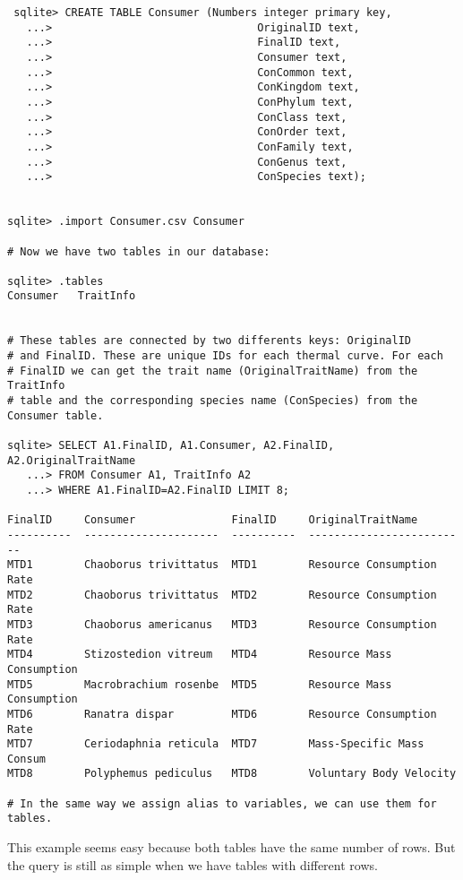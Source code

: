  \begin{lstlisting}
 sqlite> CREATE TABLE Consumer (Numbers integer primary key,
   ...>                                OriginalID text,
   ...>                                FinalID text,
   ...>                                Consumer text,
   ...>                                ConCommon text,
   ...>                                ConKingdom text,
   ...>                                ConPhylum text,
   ...>                                ConClass text,
   ...>                                ConOrder text,
   ...>                                ConFamily text,
   ...>                                ConGenus text,
   ...>                                ConSpecies text);

 
sqlite> .import Consumer.csv Consumer

# Now we have two tables in our database:

sqlite> .tables
Consumer   TraitInfo

 
# These tables are connected by two differents keys: OriginalID
# and FinalID. These are unique IDs for each thermal curve. For each
# FinalID we can get the trait name (OriginalTraitName) from the TraitInfo
# table and the corresponding species name (ConSpecies) from the Consumer table.

sqlite> SELECT A1.FinalID, A1.Consumer, A2.FinalID,  A2.OriginalTraitName
   ...> FROM Consumer A1, TraitInfo A2
   ...> WHERE A1.FinalID=A2.FinalID LIMIT 8;

FinalID     Consumer               FinalID     OriginalTraitName        
----------  ---------------------  ----------  -------------------------
MTD1        Chaoborus trivittatus  MTD1        Resource Consumption Rate
MTD2        Chaoborus trivittatus  MTD2        Resource Consumption Rate
MTD3        Chaoborus americanus   MTD3        Resource Consumption Rate
MTD4        Stizostedion vitreum   MTD4        Resource Mass Consumption
MTD5        Macrobrachium rosenbe  MTD5        Resource Mass Consumption
MTD6        Ranatra dispar         MTD6        Resource Consumption Rate
MTD7        Ceriodaphnia reticula  MTD7        Mass-Specific Mass Consum
MTD8        Polyphemus pediculus   MTD8        Voluntary Body Velocity 

# In the same way we assign alias to variables, we can use them for tables.

\end{lstlisting}
 This example seems easy because both tables have the same number of rows. But the
 query is still as simple when we have tables with different rows.

